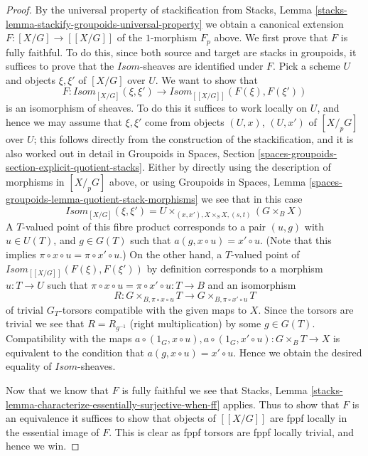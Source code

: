 \begin{proof}
\medskip\noindent
By the universal property of stackification from
Stacks, Lemma \ref{stacks-lemma-stackify-groupoids-universal-property}
we obtain a canonical extension $F : [X/G] \to [[X/G]]$ of the $1$-morphism
$F_p$ above. We first prove that $F$ is fully faithful.
To do this, since both source and target are stacks in groupoids,
it suffices to prove that the $\mathit{Isom}$-sheaves are identified
under $F$. Pick a scheme $U$ and objects $\xi, \xi'$ of
$[X/G]$ over $U$. We want to show that
$$
F :
\mathit{Isom}_{[X/G]}(\xi, \xi')
\longrightarrow
\mathit{Isom}_{[[X/G]]}(F(\xi), F(\xi'))
$$
is an isomorphism of sheaves. To do this it suffices to work locally
on $U$, and hence we may assume that $\xi, \xi'$ come from objects
$(U, x)$, $(U, x')$ of $[X/_{\!p}G]$ over $U$; this follows directly
from the construction of the stackification, and it is also worked
out in detail in
Groupoids in Spaces,
Section \ref{spaces-groupoids-section-explicit-quotient-stacks}.
Either by directly using the description of morphisms in
$[X/_{\!p}G]$ above, or using
Groupoids in Spaces,
Lemma \ref{spaces-groupoids-lemma-quotient-stack-morphisms}
we see that in this case
$$
\mathit{Isom}_{[X/G]}(\xi, \xi') =
U \times_{(x, x'), X \times_S X, (s, t)} (G \times_B X)
$$
A $T$-valued point of this fibre product corresponds to a pair
$(u, g)$ with $u \in U(T)$, and $g \in G(T)$ such that
$a(g, x \circ u) = x' \circ u$. (Note that this implies
$\pi \circ x \circ u = \pi \circ x' \circ u$.)
On the other hand, a $T$-valued
point of $\mathit{Isom}_{[[X/G]]}(F(\xi), F(\xi'))$ by definition
corresponds to a morphism $u : T \to U$ such that
$\pi \circ x \circ u = \pi \circ x' \circ u : T \to B$ and an isomorphism
$$
R :
G \times_{B, \pi \circ x \circ u} T
\longrightarrow
G \times_{B, \pi \circ x' \circ u} T
$$
of trivial $G_T$-torsors compatible with the given maps to $X$.
Since the torsors are trivial we see that $R = R_{g^{-1}}$
(right multiplication) by some $g \in G(T)$. Compatibility with the maps
$a \circ (1_G, x \circ u), a \circ (1_G, x' \circ u) : G \times_B T \to X$
is equivalent to the condition that $a(g, x \circ u) = x' \circ u$.
Hence we obtain the desired equality of $\mathit{Isom}$-sheaves.

\medskip\noindent
Now that we know that $F$ is fully faithful we see that
Stacks, Lemma \ref{stacks-lemma-characterize-essentially-surjective-when-ff}
applies. Thus to show that $F$ is an equivalence it suffices
to show that objects of $[[X/G]]$ are fppf locally in the essential image
of $F$. This is clear as fppf torsors are fppf locally trivial, and hence
we win.
\end{proof}

